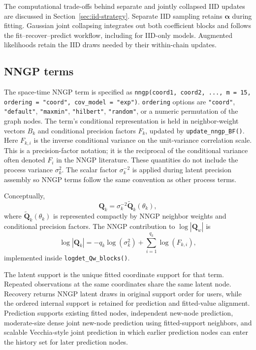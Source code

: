 \documentclass[11pt]{article}
\newcommand{\balpha}{\bm{\alpha}}
\newcommand{\bQ}{\bm{Q}}
\begin{document}
The computational trade-offs behind separate and jointly collapsed IID updates are discussed in Section~\ref{sec:iid-strategy}. Separate IID sampling retains $\balpha$ during fitting. Gaussian joint collapsing integrates out both coefficient blocks and follows the fit--recover--predict workflow, including for IID-only models. Augmented likelihoods retain the IID draws needed by their within-chain updates.

\subsection{NNGP terms}

The space-time NNGP term is specified as \texttt{nngp(coord1, coord2, ..., m = 15, ordering = "coord", cov\_model = "exp")}. \texttt{ordering} options are \texttt{"coord"}, \texttt{"default"}, \texttt{"maxmin"}, \texttt{"hilbert"}, \texttt{"random"}, or a numeric permutation of the graph nodes. The term's conditional representation is held in neighbor-weight vectors $B_k$ and conditional precision factors $F_k$, updated by \texttt{update\_nngp\_BF()}. Here $F_{k,i}$ is the inverse conditional variance on the unit-variance correlation scale. This is a precision-factor notation; it is the reciprocal of the conditional variance often denoted $F_i$ in the NNGP literature. These quantities do not include the process variance $\sigma_k^2$. The scalar factor $\sigma_k^{-2}$ is applied during latent precision assembly so NNGP terms follow the same convention as other process terms.

Conceptually,
\begin{equation}
  \bQ_k = \sigma_k^{-2} \widetilde{\bQ}_k(\theta_k),
\end{equation}
where $\widetilde{\bQ}_k(\theta_k)$ is represented compactly by NNGP neighbor weights and conditional precision factors. The NNGP contribution to $\log|\bQ_w|$ is
\begin{equation}
  \label{eq:logdet-nngp}
  \log |\bQ_k| = -q_k \log(\sigma_k^2) + \sum_{i=1}^{q_k} \log(F_{k,i}),
\end{equation}
implemented inside \texttt{logdet\_Qw\_blocks()}.

The latent support is the unique fitted coordinate support for that term. Repeated observations at the same coordinates share the same latent node. Recovery returns NNGP latent draws in original support order for users, while the ordered internal support is retained for prediction and fitted-value alignment. Prediction supports existing fitted nodes, independent new-node prediction, moderate-size dense joint new-node prediction using fitted-support neighbors, and scalable Vecchia-style joint prediction in which earlier prediction nodes can enter the history set for later prediction nodes.
\end{document}
